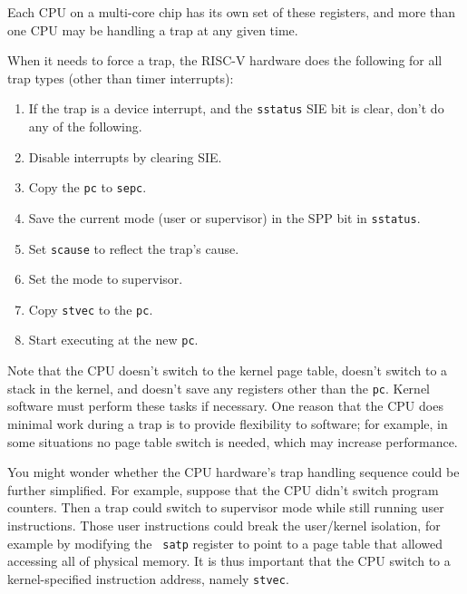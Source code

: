 Each CPU on a multi-core chip has its own set of these registers,
and more than one CPU may be handling a trap at any given time.

When it needs to force a trap, the RISC-V hardware does the
following for all trap types (other than timer interrupts):

\begin{enumerate}

\item If the trap is a device interrupt, and the {\tt sstatus} SIE bit
  is clear, don't do any of the following.

\item Disable interrupts by clearing SIE.

\item Copy the {\tt pc} to {\tt sepc}.

\item Save the current mode (user or supervisor) in the SPP bit in {\tt sstatus}.

\item Set {\tt scause} to reflect the trap's cause.

\item Set the mode to supervisor.

\item Copy {\tt stvec} to the {\tt pc}.

\item Start executing at the new {\tt pc}.

\end{enumerate}

Note that the CPU doesn't switch to the kernel page table, doesn't
switch to a stack in the kernel, and doesn't save any registers other
than the {\tt pc}. Kernel software must perform these tasks if necessary.
One reason that the CPU does minimal work during a trap is to provide
flexibility to software; for example, in some situations no page table
switch is needed, which may increase performance.

You might wonder whether the CPU hardware's trap handling sequence
could be further simplified. For example, suppose that the CPU didn't
switch program counters. Then a trap could switch to supervisor mode
while still running user instructions. Those user instructions could
break the user/kernel isolation, for example by modifying the {\tt
  satp} register to point to a page table that allowed accessing all
of physical memory. It is thus important that the CPU switch to a
kernel-specified instruction address, namely {\tt stvec}.

